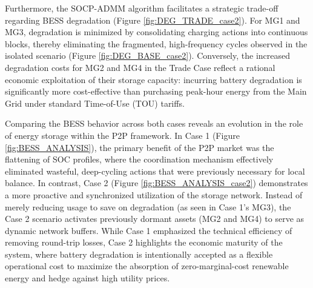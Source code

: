 \documentclass[preprint,12pt]{elsarticle}
\begin{document}
    Furthermore, the SOCP-ADMM algorithm facilitates a strategic trade-off regarding BESS degradation (Figure \ref{fig:DEG_TRADE_case2}). For MG1 and MG3, degradation is minimized by consolidating charging actions into continuous blocks, thereby eliminating the fragmented, high-frequency cycles observed in the isolated scenario (Figure \ref{fig:DEG_BASE_case2}). Conversely, the increased degradation costs for MG2 and MG4 in the Trade Case reflect a rational economic exploitation of their storage capacity: incurring battery degradation is significantly more cost-effective than purchasing peak-hour energy from the Main Grid under standard Time-of-Use (TOU) tariffs.

    Comparing the BESS behavior across both cases reveals an evolution in the role of energy storage within the P2P framework. In Case 1 (Figure \ref{fig:BESS_ANALYSIS}), the primary benefit of the P2P market was the flattening of SOC profiles, where the coordination mechanism effectively eliminated wasteful, deep-cycling actions that were previously necessary for local balance. In contrast, Case 2 (Figure \ref{fig:BESS_ANALYSIS_case2}) demonstrates a more proactive and synchronized utilization of the storage network. Instead of merely reducing usage to save on degradation (as seen in Case 1's MG3), the Case 2 scenario activates previously dormant assets (MG2 and MG4) to serve as dynamic network buffers. While Case 1 emphasized the technical efficiency of removing round-trip losses, Case 2 highlights the economic maturity of the system, where battery degradation is intentionally accepted as a flexible operational cost to maximize the absorption of zero-marginal-cost renewable energy and hedge against high utility prices.
\end{document}
